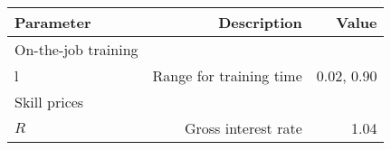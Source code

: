 \begin{tabular}{lrr}
\hline
Parameter & Description  & Value  \\ 
\hline
On-the-job training &   &   \\ 
l & Range for training time  & 0.02, 0.90  \\ 
Skill prices &   &   \\ 
$R$ & Gross interest rate  & 1.04  \\ 
\hline
\end{tabular}%
